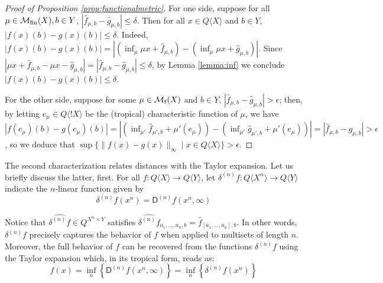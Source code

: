   
  \begin{proof}[Proof of Proposition \ref{prop:functionalmetric}]
For one side, suppose for all $\mu\in \mathcal{M}_{\mathrm{fin}}(X),b\in Y$, 
$|\widehat f_{\mu,b}-\widehat g_{\mu,b}|\leq \delta$. Then for all $ x \in Q\langle X\rangle$ and $b\in Y$, $|f( x )(b)-g( x )(b)|\leq \delta$.
Indeed, $|f( x )(b)-g( x )(b)|= |( \inf_{\mu}\mu  x +\widehat f_{\mu,b})- (\inf_{\mu}\mu  x +\widehat g_{\mu,b})|$. 
Since $|\mu  x +\widehat f_{\mu,b} - \mu  x  -\widehat g_{\mu,b}|= |\widehat f_{\mu,b}-\widehat g_{\mu,b}|\leq \delta$, by Lemma \ref{lemma:inf} we conclude $|f( x )(b)-g( x )(b)|\leq \delta$. 


For the other side, suppose for some $\mu\in \mathcal{M}_{\mathrm f}(X)$ and $b\in Y$, $|\widehat f_{\mu,b}-\widehat g_{\mu,b}|> \epsilon$; 
then, by letting $e_{\mu}\in Q\langle !X\rangle$ be the (tropical) characteristic function of $\mu$, we have
 $|f(e_{\mu})({b})-g(e_{\mu})({b})| =
|( \inf_{\mu'}\widehat f_{\mu',b}+ \mu'(e_{\mu}))-
( \inf_{\mu'}\widehat g_{\mu',b}+\mu'(e_{\mu}))|=
|\widehat f_{\mu,b}- \widehat g_{\mu,b}|> \epsilon$, so we deduce that 
$\sup\{\| f( x )- g( x ) \|_{\infty}\mid  x \in Q\langle X\rangle\}> \epsilon$.
\end{proof}


The second characterization relates distances with the Taylor expansion. Let us briefly discuss the latter, first.
For all $f: Q\langle X\rangle \to Q\langle Y\rangle$, let $\delta^{(n)}f:Q\langle X^{n}\rangle \to Q\langle Y\rangle$ indicate the $n$-linear function given by 
$$
\delta^{(n)}f( x ^{n})=\mathsf D^{(n)}f( x ^{n}, \infty)
$$

Notice that $\widehat{\delta^{(n)}f}\in Q^{X^{n}\times Y}$ satisfies 
$\widehat{\delta^{(n)}f}_{a_{1},\dots, a_{n},b}= \widehat f_{[a_{1},\dots, a_{n}],b}$.
In other words, $\delta^{(n)}f$ precisely captures the behavior of $f$ when applied to multisets of length $n$. Moreover, the full behavior of $f$ can be recovered from the functions $\delta^{(n)}f$ using the Taylor expansion which, in its tropical form, reads as:
\begin{equation*}
f( x )= \inf_{n}\left \{\mathsf D^{(n)}f( x ^{n},\infty)\right\}= \inf_{n}\left \{\delta^{(n)}f( x ^{n})\right\}
\end{equation*}





